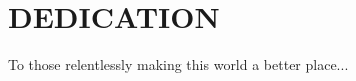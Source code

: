 %
%
%

\chapter*{\texorpdfstring{\MakeUppercase{DEDICATION}}{DEDICATION}}


To those relentlessly making this world a better place...


\pagebreak{}
